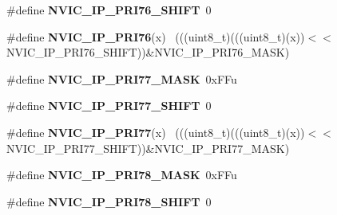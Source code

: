 \begin{DoxyCompactItemize}
\item 
\hypertarget{group___n_v_i_c___register___masks_gae428eaa004561cff08cd684d38c9beba}{}\#define {\bfseries N\+V\+I\+C\+\_\+\+I\+P\+\_\+\+P\+R\+I76\+\_\+\+S\+H\+I\+F\+T}~0\label{group___n_v_i_c___register___masks_gae428eaa004561cff08cd684d38c9beba}

\item 
\hypertarget{group___n_v_i_c___register___masks_ga972cf090db04ec8e3089018f25c36929}{}\#define {\bfseries N\+V\+I\+C\+\_\+\+I\+P\+\_\+\+P\+R\+I76}(x)                                              ~(((uint8\+\_\+t)(((uint8\+\_\+t)(x))$<$$<$N\+V\+I\+C\+\_\+\+I\+P\+\_\+\+P\+R\+I76\+\_\+\+S\+H\+I\+F\+T))\&N\+V\+I\+C\+\_\+\+I\+P\+\_\+\+P\+R\+I76\+\_\+\+M\+A\+S\+K)\label{group___n_v_i_c___register___masks_ga972cf090db04ec8e3089018f25c36929}

\item 
\hypertarget{group___n_v_i_c___register___masks_ga42a935507c027cb14679e23d9513af82}{}\#define {\bfseries N\+V\+I\+C\+\_\+\+I\+P\+\_\+\+P\+R\+I77\+\_\+\+M\+A\+S\+K}~0x\+F\+Fu\label{group___n_v_i_c___register___masks_ga42a935507c027cb14679e23d9513af82}

\item 
\hypertarget{group___n_v_i_c___register___masks_ga3af5b5ad7f9f6b2fa12856b174e8f4b6}{}\#define {\bfseries N\+V\+I\+C\+\_\+\+I\+P\+\_\+\+P\+R\+I77\+\_\+\+S\+H\+I\+F\+T}~0\label{group___n_v_i_c___register___masks_ga3af5b5ad7f9f6b2fa12856b174e8f4b6}

\item 
\hypertarget{group___n_v_i_c___register___masks_ga05c01bfc787dc57a053e2d64930c68df}{}\#define {\bfseries N\+V\+I\+C\+\_\+\+I\+P\+\_\+\+P\+R\+I77}(x)                                              ~(((uint8\+\_\+t)(((uint8\+\_\+t)(x))$<$$<$N\+V\+I\+C\+\_\+\+I\+P\+\_\+\+P\+R\+I77\+\_\+\+S\+H\+I\+F\+T))\&N\+V\+I\+C\+\_\+\+I\+P\+\_\+\+P\+R\+I77\+\_\+\+M\+A\+S\+K)\label{group___n_v_i_c___register___masks_ga05c01bfc787dc57a053e2d64930c68df}

\item 
\hypertarget{group___n_v_i_c___register___masks_ga337c967d126acd00155666728025cc55}{}\#define {\bfseries N\+V\+I\+C\+\_\+\+I\+P\+\_\+\+P\+R\+I78\+\_\+\+M\+A\+S\+K}~0x\+F\+Fu\label{group___n_v_i_c___register___masks_ga337c967d126acd00155666728025cc55}

\item 
\hypertarget{group___n_v_i_c___register___masks_ga5b19bf29c761748f4ce34b780168aaee}{}\#define {\bfseries N\+V\+I\+C\+\_\+\+I\+P\+\_\+\+P\+R\+I78\+\_\+\+S\+H\+I\+F\+T}~0\label{group___n_v_i_c___register___masks_ga5b19bf29c761748f4ce34b780168aaee}


\end{DoxyCompactItemize}
